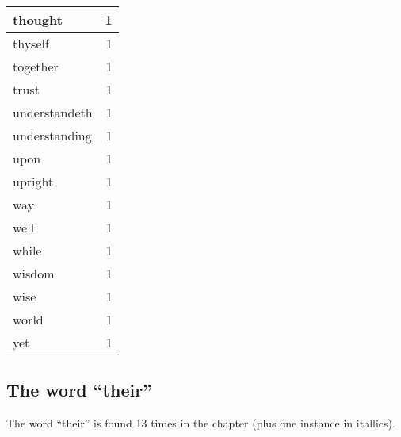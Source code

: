 \begin{center}
\begin{longtable}{l|r}
thought & 1 \\ \hline
thyself & 1 \\ \hline
together & 1 \\ \hline
trust & 1 \\ \hline
understandeth & 1 \\ \hline
understanding & 1 \\ \hline
upon & 1 \\ \hline
upright & 1 \\ \hline
way & 1 \\ \hline
well & 1 \\ \hline
while & 1 \\ \hline
wisdom & 1 \\ \hline
wise & 1 \\ \hline
world & 1 \\ \hline
yet & 1 \\ \hline
\end{longtable}
\end{center}



\normalsize

\subsection{The word ``their''}
The word ``their'' is found 13 times in the chapter (plus one instance in itallics).

